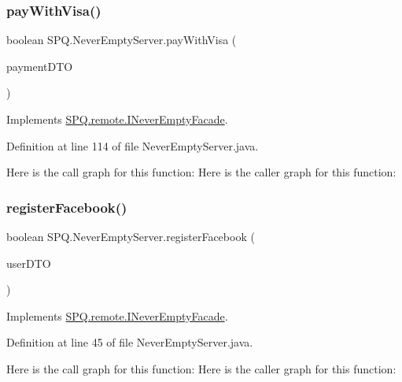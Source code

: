 \subsubsection{\texorpdfstring{pay\+With\+Visa()}{payWithVisa()}}
{\footnotesize\ttfamily boolean S\+P\+Q.\+Never\+Empty\+Server.\+pay\+With\+Visa (\begin{DoxyParamCaption}\item[{\mbox{\hyperlink{class_s_p_q_1_1dto_1_1_payment_d_t_o}{Payment\+D\+TO}}}]{payment\+D\+TO }\end{DoxyParamCaption})}



Implements \mbox{\hyperlink{interface_s_p_q_1_1remote_1_1_i_never_empty_facade_a3b7058d95e7b73bdcc09220ecfc2d744}{S\+P\+Q.\+remote.\+I\+Never\+Empty\+Facade}}.



Definition at line 114 of file Never\+Empty\+Server.\+java.

Here is the call graph for this function\+:
Here is the caller graph for this function\+:
\mbox{\label{class_s_p_q_1_1_never_empty_server_abf7e271e0edb91e8f8ed73063de74b03}} 
\subsubsection{\texorpdfstring{register\+Facebook()}{registerFacebook()}}
{\footnotesize\ttfamily boolean S\+P\+Q.\+Never\+Empty\+Server.\+register\+Facebook (\begin{DoxyParamCaption}\item[{\mbox{\hyperlink{class_s_p_q_1_1dto_1_1_user_d_t_o}{User\+D\+TO}}}]{user\+D\+TO }\end{DoxyParamCaption})}



Implements \mbox{\hyperlink{interface_s_p_q_1_1remote_1_1_i_never_empty_facade_a7b2f025522489fe9070d09a4fb08f0a1}{S\+P\+Q.\+remote.\+I\+Never\+Empty\+Facade}}.



Definition at line 45 of file Never\+Empty\+Server.\+java.

Here is the call graph for this function\+:
Here is the caller graph for this function\+:
\mbox{\label{class_s_p_q_1_1_never_empty_server_ac97355451c02fc378cb5d8f33f442ce6}} 
